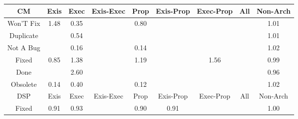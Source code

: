 \begin{tabular}{|c||c|c|c|c|c|c|c|c|}
\hline
\hline
CM & Exis & Exec & Exis-Exec & Prop & Exis-Prop & Exec-Prop & All & Non-Arch \\ 
\hline
Won'T Fix & \cellcolor[rgb]{0.9075955021141481,0.8388610273172279,0.42} 1.48 & \cellcolor[rgb]{0.8005919733831275,0.32213534068013705,0.3178858418242524} 0.35 &  & \cellcolor[rgb]{0.8763499897861713,0.680723284987877,0.38859332380042644} 0.80 &  &  &  & \cellcolor[rgb]{0.9099316494937114,0.8399676234443896,0.42} 1.01 \\ 
\hline
Duplicate &  & \cellcolor[rgb]{0.8316417190666192,0.4691041369153308,0.34686560446217796} 0.54 &  &  &  &  &  & \cellcolor[rgb]{0.909946135924248,0.8399744854378016,0.42} 1.01 \\ 
\hline
Not A Bug &  & \cellcolor[rgb]{0.7686112703361069,0.17076001292423929,0.2880371856470331} 0.16 &  & \cellcolor[rgb]{0.7643352531465317,0.15052019822691662,0.28404623627009623} 0.14 &  &  &  & \cellcolor[rgb]{0.9098758274963601,0.8399411814456441,0.42} 1.02 \\ 
\hline
Fixed & \cellcolor[rgb]{0.8846057383525815,0.7198004948688853,0.39629868912907595} 0.85 & \cellcolor[rgb]{0.9080862767574598,0.8390934995166913,0.42} 1.38 &  & \cellcolor[rgb]{0.9090299810569892,0.8395405173427843,0.42} 1.19 &  & \cellcolor[rgb]{0.9072116260203072,0.8386791912727771,0.42} 1.56 &  & \cellcolor[rgb]{0.9084931487562489,0.8328675707795782,0.4185936055058323} 0.99 \\ 
\hline
Done &  & \cellcolor[rgb]{0.901979749436447,0.8362009339435801,0.42} 2.60 &  &  &  &  &  & \cellcolor[rgb]{0.9036491556219932,0.8099393366107674,0.41407254524719356} 0.96 \\ 
\hline
Obsolete & \cellcolor[rgb]{0.7648477047809692,0.15294580262992097,0.2845245244622379} 0.14 & \cellcolor[rgb]{0.8080721805023449,0.35754165437776564,0.3248673684688552} 0.40 &  & \cellcolor[rgb]{0.7609876080406193,0.13467467805893157,0.28092176750457803} 0.12 &  &  &  & \cellcolor[rgb]{0.9098997414557164,0.8399525091106025,0.42} 1.02 \\ 
\hline
\hline
DSP & Exis & Exec & Exis-Exec & Prop & Exis-Prop & Exec-Prop & All & Non-Arch \\ 
\hline
Fixed & \cellcolor[rgb]{0.89557953882213,0.7717431504247488,0.4065409029006547} 0.91 & \cellcolor[rgb]{0.8982598857106119,0.7844301256968963,0.4090425599965711} 0.93 &  & \cellcolor[rgb]{0.8932615409543312,0.7607712938505009,0.40437743822404243} 0.90 & \cellcolor[rgb]{0.8941970039842425,0.765199152192081,0.4052505370519596} 0.91 &  &  & \cellcolor[rgb]{0.9099815174480518,0.8399912451069718,0.42} 1.00 \\ 

\end{tabular}
